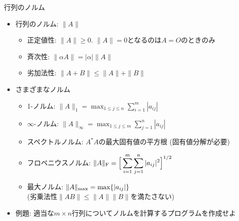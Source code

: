 \begin{frame}[t,fragile]{行列のノルム}
  \begin{itemize}
  \item 行列のノルム: $\| A \|$
    \begin{itemize}
    \item 正定値性: $\| A \| \ge 0$. $\| A \| = 0$となるのは$A=O$のときのみ
    \item 斉次性: $\| \alpha A \| = |\alpha| \| A \|$
    \item 劣加法性: $\| A+B \| \le \| A \| + \| B \|$
    \end{itemize}
  \item さまざまなノルム
    \begin{itemize}
    \item 1-ノルム: $\displaystyle \| A \|_1 = \max_{1 \le j \le n} \sum_{i=1}^m | a_{ij} |$
    \item $\infty$-ノルム: $\displaystyle \| A \|_\infty = \max_{1 \le j \le m} \sum_{j=1}^n | a_{ij} |$
    \item スペクトルノルム: $A^* A$の最大固有値の平方根 (固有値分解が必要)
    \item フロベニウスノルム: $\displaystyle \| A \|_{\rm F} = \Big[ \sum_{i=1}^m \sum_{j=1}^n |a_{ij}|^2 \Big]^{1/2}$
    \item 最大ノルム: $\displaystyle \| A \|_{\rm max} = \max \{ | a_{ij} | \}$ \\ (劣乗法性$\| AB \| \le \| A \| \| B \|$を満たさない)
    \end{itemize}
  \item 例題: 適当な$m \times n$行列についてノルムを計算するプログラムを作成せよ
  \end{itemize}
\end{frame}
